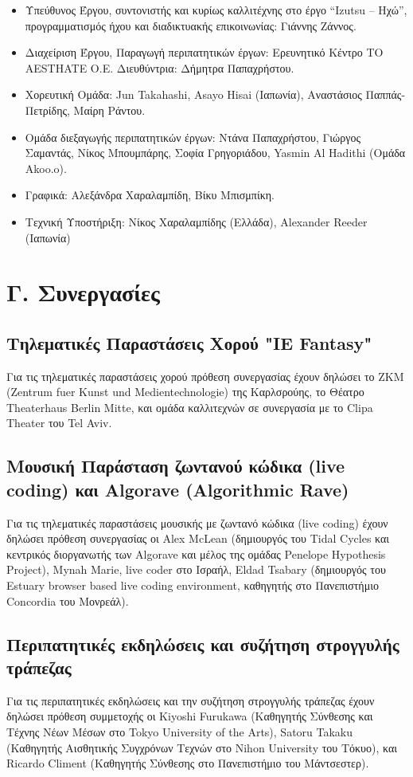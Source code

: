 \begin{itemize}
\item Υπεύθυνος Έργου, συντονιστής και κυρίως καλλιτέχνης στο έργο “Izutsu – Ηχώ”, προγραμματισμός ήχου και διαδικτυακής επικοινωνίας: Γιάννης Ζάννος.
\item Διαχείριση Έργου, Παραγωγή περιπατητικών έργων: Ερευνητικό Κέντρο ΤΟ ΑΕSTHATE O.E. Διευθύντρια: Δήμητρα Παπαχρήστου.
\item Χορευτική Ομάδα: Jun Takahashi, Asayo Hisai (Ιαπωνία), Αναστάσιος Παππάς-Πετρίδης, Μαίρη Ράντου.
\item Ομάδα διεξαγωγής περιπατητικών έργων: Ντάνα Παπαχρήστου, Γιώργος Σαμαντάς, Νίκος Μπουμπάρης, Σοφία Γρηγοριάδου, Yasmin Al Hadithi (Ομάδα Αkoo.o).
\item Γραφικά: Αλεξάνδρα Χαραλαμπίδη, Βίκυ Μπισμπίκη.
\item Τεχνική Υποστήριξη: Νίκος Χαραλαμπίδης (Ελλάδα), Alexander Reeder (Ιαπωνία)
\end{itemize}

\section{Γ. Συνεργασίες}
\label{sec:org894b729}

\subsection{Τηλεματικές Παραστάσεις Χορού "IE Fantasy"}
\label{sec:org5587ea9}

Για τις τηλεματικές παραστάσεις χορού πρόθεση συνεργασίας έχουν δηλώσει το ZKM (Zentrum fuer Kunst und Medientechnologie) της Καρλσρούης, το Θέατρο Theaterhaus Berlin Mitte, και ομάδα καλλιτεχνών σε συνεργασία με το Clipa Theater του Tel Aviv. 

\subsection{Μουσική Παράσταση ζωντανού κώδικα (live coding) και Algorave (Algorithmic Rave)}
\label{sec:orga411434}
Για τις τηλεματικές παραστάσεις μουσικής με ζωντανό κώδικα (live coding) έχουν δηλώσει πρόθεση συνεργασίας οι Alex McLean (δημιουργός του Tidal Cycles και κεντρικός διοργανωτής των Algorave και μέλος της ομάδας Penelope Hypothesis Project), Mynah Marie, live coder στο Ισραήλ, Eldad Tsabary (δημιουργός του Estuary browser based live coding environment, καθηγητής στο Πανεπιστήμιο Concordia του Μονρεάλ). 

\subsection{Περιπατητικές εκδηλώσεις και συζήτηση στρογγυλής τράπεζας}
\label{sec:orgcf8e3bd}
Για τις περιπατητικές εκδηλώσεις και την συζήτηση στρογγυλής τράπεζας έχουν δηλώσει πρόθεση συμμετοχής οι Kiyoshi Furukawa (Καθηγητής Σύνθεσης και Τέχνης Νέων Μέσων στο Tokyo University of the Arts), Satoru Takaku (Καθηγητής Αισθητικής Συγχρόνων Τεχνών στο Nihon University του Τόκυο), και Ricardo Climent (Kαθηγητής Σύνθεσης στο Πανεπιστήμιο του Μάντσεστερ). 

